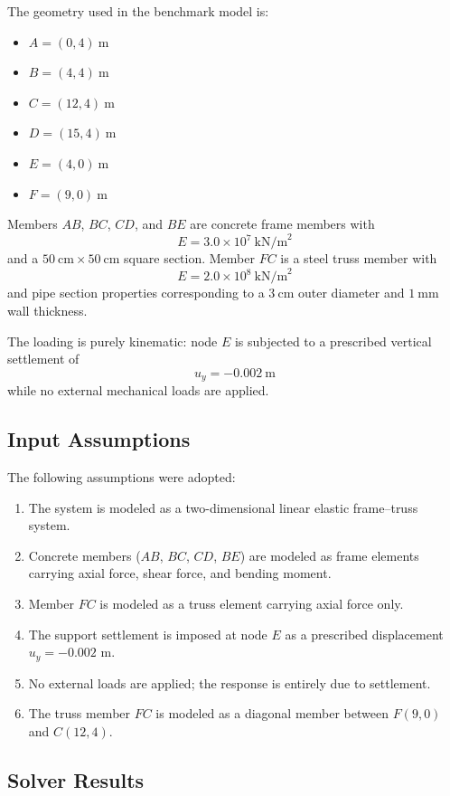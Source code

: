 The geometry used in the benchmark model is:
\begin{itemize}
    \item $A = (0,4)\ \text{m}$
    \item $B = (4,4)\ \text{m}$
    \item $C = (12,4)\ \text{m}$
    \item $D = (15,4)\ \text{m}$
    \item $E = (4,0)\ \text{m}$
    \item $F = (9,0)\ \text{m}$
\end{itemize}

Members $AB$, $BC$, $CD$, and $BE$ are concrete frame members with 
\[
E = 3.0\times10^7\ \text{kN/m}^2
\]
and a $50\ \text{cm} \times 50\ \text{cm}$ square section. Member $FC$ is a steel truss member with
\[
E = 2.0\times10^8\ \text{kN/m}^2
\]
and pipe section properties corresponding to a $3\ \text{cm}$ outer diameter and $1\ \text{mm}$ wall thickness.

The loading is purely kinematic: node $E$ is subjected to a prescribed vertical settlement of
\[
u_y = -0.002\ \text{m}
\]
while no external mechanical loads are applied.



\subsection{Input Assumptions}

The following assumptions were adopted:

\begin{enumerate}
    \item The system is modeled as a two-dimensional linear elastic frame--truss system.
    \item Concrete members ($AB$, $BC$, $CD$, $BE$) are modeled as frame elements carrying axial force, shear force, and bending moment.
    \item Member $FC$ is modeled as a truss element carrying axial force only.
    \item The support settlement is imposed at node $E$ as a prescribed displacement $u_y = -0.002$ m.
    \item No external loads are applied; the response is entirely due to settlement.
    \item The truss member $FC$ is modeled as a diagonal member between $F(9,0)$ and $C(12,4)$.
\end{enumerate}

\subsection{Solver Results}

